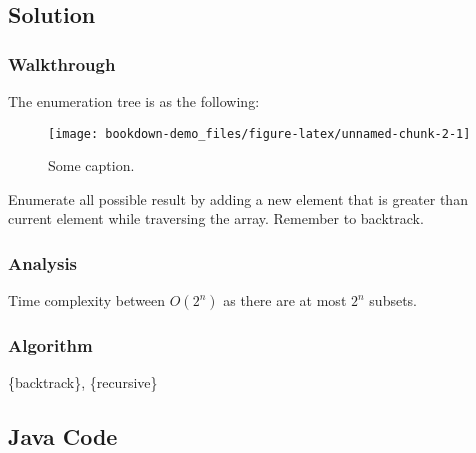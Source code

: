 \documentclass[]{book}
\begin{document}
\hypertarget{solution-10}{%
\subsection{Solution}\label{solution-10}}

\hypertarget{walkthrough-14}{%
\subsubsection{Walkthrough}\label{walkthrough-14}}

The enumeration tree is as the following:

\begin{figure}
\texttt{[image: bookdown-demo\_files/figure-latex/unnamed-chunk-2-1]} \caption{Some caption.}\label{fig:unnamed-chunk-2}
\end{figure}

Enumerate all possible result by adding a new element that is greater than current element while traversing the array.
Remember to backtrack.

\hypertarget{analysis-16}{%
\subsubsection{Analysis}\label{analysis-16}}

Time complexity between \(O(2^{n})\) as there are at most \(2^n\) subsets.

\hypertarget{algorithm-16}{%
\subsubsection{Algorithm}\label{algorithm-16}}

\{backtrack\}, \{recursive\}

\hypertarget{java-code-12}{%
\subsection{Java Code}\label{java-code-12}}
\end{document}
